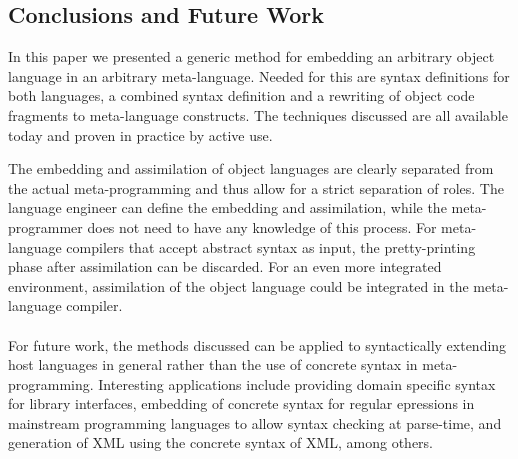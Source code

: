 \documentclass[a4paper,11pt]{article}
\begin{document}
\subsection{Conclusions and Future Work}

In this paper we presented a generic method for embedding an arbitrary object
language in an arbitrary meta-language. Needed for this are syntax definitions
for both languages, a combined syntax definition and a rewriting of object code
fragments to meta-language constructs. The techniques discussed are all 
available today and proven in practice by active use.

The embedding and assimilation of object languages are clearly separated from
the actual meta-programming and thus allow for a strict separation of roles.
The language engineer can define the embedding and assimilation, while the
meta-programmer does not need to have any knowledge of this process. For
meta-language compilers that accept abstract syntax as input, the pretty-printing
phase after assimilation can be discarded. For an even more integrated environment,
assimilation of the object language could be integrated in the meta-language
compiler. 

\paragraph{}

For future work, the methods discussed can be applied to syntactically extending
host languages in general rather than the use of concrete syntax in
meta-programming. Interesting applications include providing domain specific
syntax for library interfaces, embedding of concrete syntax for regular epressions
in mainstream programming languages to allow syntax checking at parse-time, and
generation of XML using the concrete syntax of XML, among others.
\end{document}
